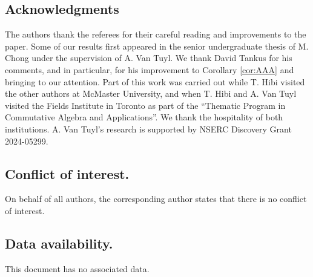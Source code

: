 \documentclass[12pt]{amsart}
\numberwithin{equation}{section}
\theoremstyle{definition}
\newcounter{i} %
\begin{document}
\subsection*{Acknowledgments}

The authors thank the referees for their
careful reading and improvements to the paper.
Some of our results first appeared in the senior undergraduate thesis
of M. Chong \cite{Cthesis} under the supervision of A. Van Tuyl. 
We thank David Tankus for his comments, and
in particular, for his improvement to Corollary \ref{cor:AAA} and
bringing \cite{LT2015} to our attention.
Part of this work was carried out while T. Hibi visited
the other authors at McMaster University, and when T. Hibi and A. Van Tuyl
visited the Fields Institute in Toronto as part of the ``Thematic Program
in Commutative Algebra and Applications''.  We thank the hospitality of 
both institutions.
A. Van Tuyl’s research is supported by NSERC Discovery Grant 2024-05299.

\subsection*{Conflict of interest.}
On behalf of all authors, the corresponding author states that there is no conflict of interest. 

\subsection*{Data availability.} This document
has no associated data.
\end{document}
